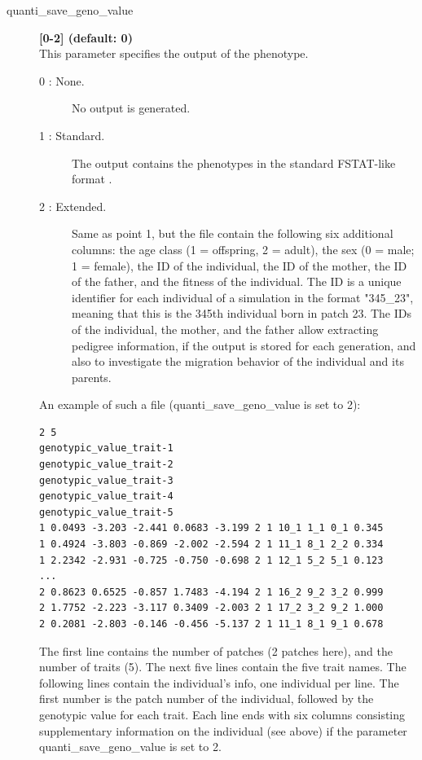 \documentclass[letterpaper,12pt,oneside]{book}
\begin{document}
\begin{description} 
\item[quanti\_save\_geno\_value] \textbf{[0-2] (default: 0)} \\
This parameter specifies the output of the phenotype.
\begin{description}
\item [0 : None.] No output is generated.
\item [1 : Standard.] The output contains the phenotypes in the standard FSTAT-like format \citep{Goudet_1995}. 
\item [2 : Extended.] Same as point 1, but the file contain the following six additional columns: the age class (1 = offspring, 2 = adult), the sex (0 = male; 1 = female), the ID of the individual, the ID of the mother, the ID of the father, and the fitness of the individual. The ID is a unique identifier for each individual of a simulation in the format "345\_23", meaning that this is the 345th individual born in patch 23. The IDs of the individual, the mother, and the father allow extracting pedigree information, if the output is stored for each generation, and also to investigate the migration behavior of the individual and its parents. 
\end{description} 

An example of such a file (\textsf{quanti\_save\_geno\_value} is set to 2):
\begin{lstlisting}[frame=single]
2 5
genotypic_value_trait-1
genotypic_value_trait-2
genotypic_value_trait-3
genotypic_value_trait-4
genotypic_value_trait-5
1 0.0493 -3.203 -2.441 0.0683 -3.199 2 1 10_1 1_1 0_1 0.345
1 0.4924 -3.803 -0.869 -2.002 -2.594 2 1 11_1 8_1 2_2 0.334
1 2.2342 -2.931 -0.725 -0.750 -0.698 2 1 12_1 5_2 5_1 0.123
...
2 0.8623 0.6525 -0.857 1.7483 -4.194 2 1 16_2 9_2 3_2 0.999
2 1.7752 -2.223 -3.117 0.3409 -2.003 2 1 17_2 3_2 9_2 1.000
2 0.2081 -2.803 -0.146 -0.456 -5.137 2 1 11_1 8_1 9_1 0.678
\end{lstlisting}

The first line contains the number of patches (2 patches here), and the number of traits (5). The next five lines contain the five trait names. The following lines contain the individual's info, one individual per line. The first number is the patch number of the individual, followed by the genotypic value for each trait.  Each line ends with six columns consisting supplementary information on the individual (see above) if the parameter \textsf{quanti\_save\_geno\_value} is set to 2.


\end{description}
\end{document}
